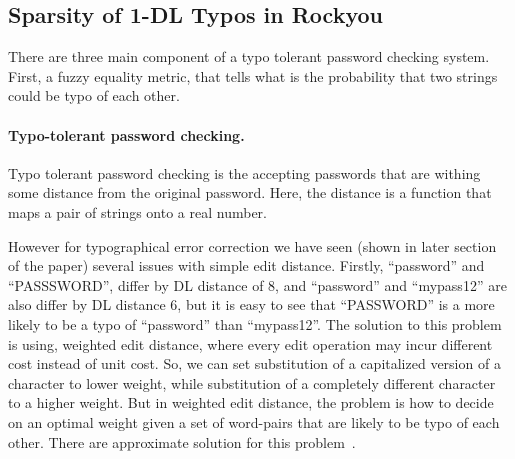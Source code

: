 \subsection{Sparsity of 1-DL Typos in Rockyou}
\fi





\iffalse

\bigskip
\bigskip
\bigskip

There are three main component of a typo tolerant password checking system. 
First, a fuzzy equality metric, that tells what is the probability that two
strings could be typo of each other.


\paragraph{Typo-tolerant password checking.}  
Typo tolerant password checking is the accepting passwords that are withing some
distance from the original password. Here, the distance is a function that maps
a pair of strings onto a real number.





  However for typographical error correction we
have seen (shown in later section of the paper) several issues with simple edit
distance. Firstly, ``password'' and ``PASSSWORD'', differ by DL distance of 8,
and ``password'' and ``mypass12'' are also differ by DL distance 6, but it is
easy to see that ``PASSWORD'' is a more likely to be a typo of ``password'' than
``mypass12''. The solution to this problem is using, weighted edit distance,
where every edit operation may incur different cost instead of unit cost. So, we
can set substitution of a capitalized version of a character to lower weight,
while substitution of a completely different character to a higher weight. But
in weighted edit distance, the problem is how to decide on an optimal weight
given a set of word-pairs that are likely to be typo of each other. There are
approximate solution for this problem~\cite{hauser2007unsupervised}.

